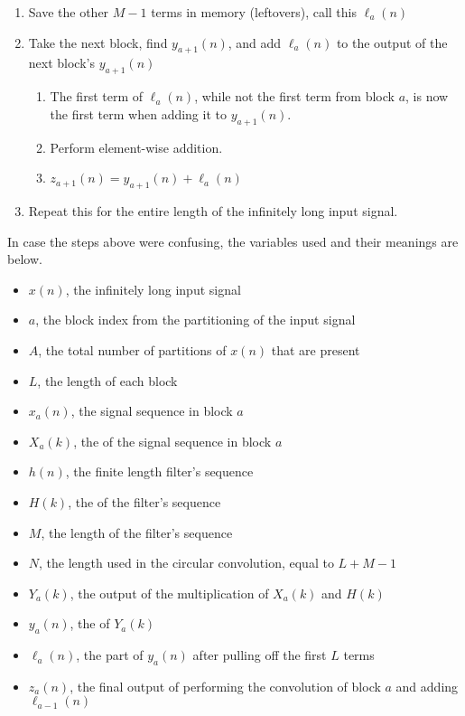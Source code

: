 \begin{enumerate}[noitemsep]
\item Save the other $M-1$ terms in memory (leftovers), call this $\ell_{a}(n)$
\item Take the next block, find $y_{a+1}(n)$, and add $\ell_{a}(n)$ to the output of the next block's $y_{a+1}(n)$
  \begin{enumerate}[noitemsep]
  \item The first term of $\ell_{a}(n)$, while not the first term from block $a$, is now the first term when adding it to $y_{a+1}(n)$.
  \item Perform element-wise addition.
  \item $z_{a+1}(n) = y_{a+1}(n) + \ell_{a}(n)$
  \end{enumerate}
\item Repeat this for the entire length of the infinitely long input signal.
\end{enumerate}

\begin{remark*}
  In case the steps above were confusing, the variables used and their meanings are below.
  \begin{itemize}[noitemsep]
  \item $x(n)$, the infinitely long input signal
  \item $a$, the block index from the partitioning of the input signal
  \item $A$, the total number of partitions of $x(n)$ that are present
  \item $L$, the length of each block
  \item $x_{a}(n)$, the signal sequence in block $a$
  \item $X_{a}(k)$, the  of the signal sequence in block $a$
  \item $h(n)$, the finite length filter's sequence
  \item $H(k)$, the  of the filter's sequence
  \item $M$, the length of the filter's sequence
  \item $N$, the length used in the circular convolution, equal to $L+M-1$
  \item $Y_{a}(k)$, the output of the multiplication of $X_{a}(k)$ and $H(k)$
  \item $y_{a}(n)$, the  of $Y_{a}(k)$
  \item $\ell_{a}(n)$, the part of $y_{a}(n)$ after pulling off the first $L$ terms
  \item $z_{a}(n)$, the final output of performing the convolution of block $a$ and adding $\ell_{a-1}(n)$
  \end{itemize}
\end{remark*}

